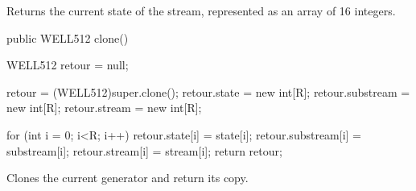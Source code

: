 \begin{tabb} Returns the current state of the stream, represented as an
  array of 16 integers.
\end{tabb}
\begin{htmlonly}
\end{htmlonly}
\begin{code}

   public WELL512 clone() \begin{hide} {
      WELL512 retour = null;

      retour = (WELL512)super.clone();
      retour.state = new int[R];
      retour.substream = new int[R];
      retour.stream = new int[R];

      for (int i = 0; i<R; i++) {
         retour.state[i] = state[i];
         retour.substream[i] = substream[i];
         retour.stream[i] = stream[i];
      }
      return retour;
   }\end{hide}
\end{code}
 \begin{tabb} Clones the current generator and return its copy.
 \end{tabb}
 \begin{htmlonly}
\end{htmlonly}
